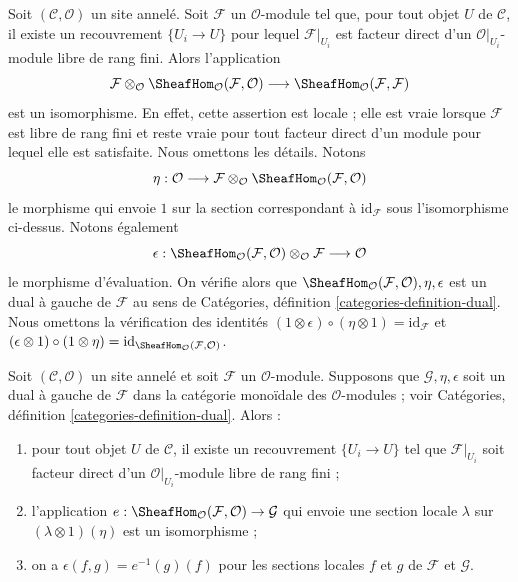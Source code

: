 \begin{example}

\label{example-dual}

Soit $(\mathcal{C}, \mathcal{O})$ un site annelé. Soit $\mathcal{F}$ un
$\mathcal{O}$-module tel que, pour tout objet $U$ de $\mathcal{C}$, il
existe un recouvrement $\{U_i \to U\}$ pour lequel
$\mathcal{F}|_{U_i}$ est facteur direct d'un
$\mathcal{O}|_{U_i}$-module libre de rang fini. Alors l'application
$$
\mathcal{F} \otimes_\mathcal{O}
\SheafHom_\mathcal{O}(\mathcal{F}, \mathcal{O})
\longrightarrow
\SheafHom_\mathcal{O}(\mathcal{F}, \mathcal{F})
$$
est un isomorphisme. En effet, cette assertion est locale ; elle est vraie
lorsque $\mathcal{F}$ est libre de rang fini et reste vraie pour tout
facteur direct d'un module pour lequel elle est satisfaite. Nous omettons
les détails. Notons
$$
\eta :
\mathcal{O}
\longrightarrow
\mathcal{F} \otimes_\mathcal{O}
\SheafHom_\mathcal{O}(\mathcal{F}, \mathcal{O})
$$
le morphisme qui envoie $1$ sur la section correspondant à
$\text{id}_\mathcal{F}$ sous l'isomorphisme ci-dessus.
Notons également
$$
\epsilon : 
\SheafHom_\mathcal{O}(\mathcal{F}, \mathcal{O})
\otimes_\mathcal{O} \mathcal{F}
\longrightarrow
\mathcal{O}
$$
le morphisme d'évaluation. On vérifie alors que
$\SheafHom_\mathcal{O}(\mathcal{F}, \mathcal{O}), \eta, \epsilon$
est un dual à gauche de $\mathcal{F}$ au sens de Catégories, définition
\ref{categories-definition-dual}. Nous omettons la vérification des
identités
$(1 \otimes \epsilon) \circ (\eta \otimes 1) = \text{id}_\mathcal{F}$
et
$(\epsilon \otimes 1) \circ (1 \otimes \eta) =
\text{id}_{\SheafHom_\mathcal{O}(\mathcal{F}, \mathcal{O})}$.

\end{example}

\begin{lemma}

\label{lemma-left-dual-module}

Soit $(\mathcal{C}, \mathcal{O})$ un site annelé et soit $\mathcal{F}$ un
$\mathcal{O}$-module. Supposons que $\mathcal{G}, \eta, \epsilon$
soit un dual à gauche de $\mathcal{F}$ dans la catégorie monoïdale des
$\mathcal{O}$-modules ; voir Catégories, définition
\ref{categories-definition-dual}. Alors :

\begin{enumerate}

\item pour tout objet $U$ de $\mathcal{C}$, il existe un recouvrement
$\{U_i \to U\}$ tel que $\mathcal{F}|_{U_i}$ soit facteur direct d'un
$\mathcal{O}|_{U_i}$-module libre de rang fini ;
\item l'application
$e : \SheafHom_\mathcal{O}(\mathcal{F}, \mathcal{O}) \to \mathcal{G}$
qui envoie une section locale $\lambda$ sur $(\lambda \otimes 1)(\eta)$
est un isomorphisme ;
\item on a $\epsilon(f, g) = e^{-1}(g)(f)$ pour les sections locales
$f$ et $g$ de $\mathcal{F}$ et $\mathcal{G}$.

\end{enumerate}

\end{lemma}

